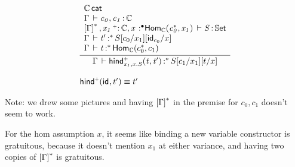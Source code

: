 \documentclass[11pt]{article}
\theoremstyle{plain}
\begin{document}

\[
\begin{array}{l}
\infer{\oftpe{\Gamma}{\morindco{x_1,x.S}{t}{t'}}{\vcond}{{\subst{\subst{S}{c_1}{x_1}}{t}{x}}}}
      { \begin{array}{l}
          \wfdtp{\C} \\
          \oftp{\Gamma}{c_0,c_1}{\C} \\
          \ofdtp{\dupctx{\Gamma}{\vcond},\catvar{x_1}{\co}{\C},\tpvar{x}{\bullet}{\Hom{\C}{c_0^\vcond}{x_1}}}{S}{\types} \\
          \oftpe{\Gamma}{t'}{\vcond}{{\subst{\subst{S}{c_0}{x_1}}{\idm{c_0}}{x}}} \\
          \oftpe{\Gamma}{t}{\vcond}{\Hom{\C}{c_0^\vcond}{c_1}} \\
        \end{array}
      }
\\ \\
\morindco{}{\idm{}}{t'} \deq t'
\end{array}
\]

Note: we drew some pictures and having $\left[\Gamma\right]^{{\mathord{*}}}$ in the
premise for $c_0,c_1$ doesn't seem to work.

For the hom assumption $x$, it seems like binding a new variable
constructor is gratuitous, because it doesn't mention $x_1$ at either
variance, and having two copies of $\left[\Gamma\right]^{{\mathord{*}}}$ is
gratuitous.

\end{document}
